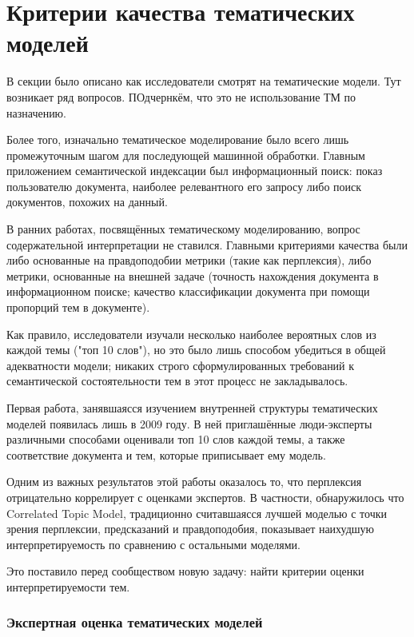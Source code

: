 \chapter{Критерии качества тематических моделей}


В секции  было описано как исследователи смотрят на тематические модели. Тут возникает ряд вопросов. ПОдчернкём, что это не использование ТМ по назначению. 

Более того, изначально тематическое моделирование было всего лишь промежуточным шагом для последующей машинной обработки. Главным приложением семантической индексации был информационный поиск: показ пользователю документа, наиболее релевантного его запросу либо поиск документов, похожих на данный. 

В ранних работах, посвящённых тематическому моделированию, вопрос содержательной интерпретации не ставился. Главными критериями качества были либо основанные на правдоподобии метрики (такие как перплексия), либо метрики, основанные на внешней задаче (точность нахождения документа в информационном поиске; качество классификации документа при помощи пропорций тем в документе).

Как правило, исследователи изучали несколько наиболее вероятных слов из каждой темы ("топ 10 слов"), но это было лишь способом убедиться в общей адекватности модели; никаких строго сформулированных требований к семантической состоятельности тем в этот процесс не закладывалось.

Первая работа, занявшаясся изучением внутренней структуры тематических моделей \cite{rtl} появилась лишь в 2009 году. В ней приглашённые люди-эксперты различными способами оценивали топ 10 слов каждой темы, а также соответствие документа и тем, которые приписывает ему модель. 

Одним из важных результатов этой работы оказалось то, что перплексия отрицательно коррелирует с оценками экспертов. В частности, обнаружилось что Correlated Topic Model, традиционно считавшаясся лучшей моделью с точки зрения перплексии, предсказаний и правдоподобия, показывает наихудшую интерпретируемость по сравнению с остальными моделями.

Это поставило перед сообществом новую задачу: найти критерии оценки интерпретируемости тем. 

\subsection{Экспертная оценка тематических моделей}

